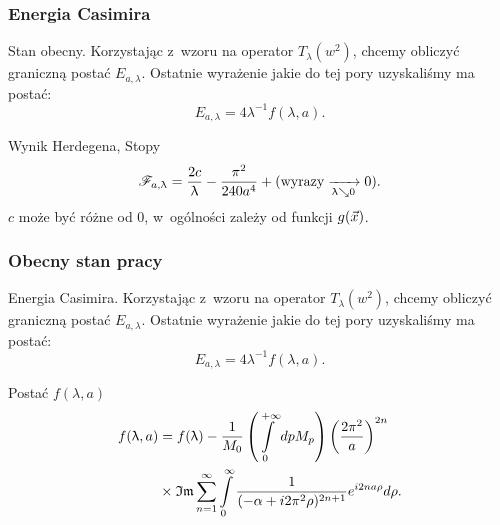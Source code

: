 \documentclass[10pt,t]{beamer}
\begin{document}
\begin{frame}
  \frametitle{Energia Casimira}


  Stan obecny. Korzystając z~wzoru na operator $T_{ \lambda }( w^{ 2 } )$, chcemy
  obliczyć graniczną postać $E_{ a, \lambda }$. Ostatnie wyrażenie jakie do tej
  pory uzyskaliśmy ma postać:
  \begin{equation}
    \label{eq:Efekt-Casimira-37}
    E_{ a, \lambda } = 4 \lambda^{ -1 } f( \lambda, a ).
  \end{equation}

  Wynik Herdegena, Stopy
  \begin{equation}
    \label{eq:Efekt-Casimira-38}
    \mathcal{F}_{ a, \uplambda } =
    \frac{ 2 c }{ \uplambda } - \frac{ \pi^{ 2 } }{ 240 a^{ 4 } }
    + ( \textrm{wyrazy} \xrightarrow[ \uplambda \searrow 0 ]{} 0 ).
  \end{equation}
  $c$ może być różne od 0, w~ogólności zależy od funkcji
  $g( \vec{ x } )$.

\end{frame}





\begin{frame}
  \frametitle{Obecny stan pracy}


  Energia Casimira. Korzystając z~wzoru na operator $T_{ \lambda }( w^{ 2 } )$,
  chcemy obliczyć graniczną postać $E_{ a, \lambda }$. Ostatnie wyrażenie jakie
  do tej pory uzyskaliśmy ma postać:
  \begin{equation}
    \label{eq:Efekt-Casimira-39}
    E_{ a, \lambda } = 4 \lambda^{ -1 } f( \lambda, a ).
  \end{equation}


  Postać $f( \lambda, a )$
  \begin{equation}
    \label{eq:Efekt-Casimira-40}
    \begin{split}
      f( \uplambda, a )
      &=
        f( \uplambda )
        - \frac{ 1 }{ M_{ 0 } }
        \left( \int\limits_{ 0 }^{ +\infty } dp M_{ p } \right)
        \left( \frac{ 2 \pi^{ 2 } }{ a } \right)^{ 2 n } \\
      &\times \operatorname{\mathfrak{Im}} \sum\limits_{ n = 1 }^{ \infty } \int\limits_{ 0 }^{ \infty }
        \frac{ 1 }{ ( -\alpha + i 2 \pi^{ 2 } \rho )^{ 2n + 1 } }
        e^{ i 2 na \rho } d\rho.
      \end{split}
    \end{equation}

\end{frame}
\end{document}
